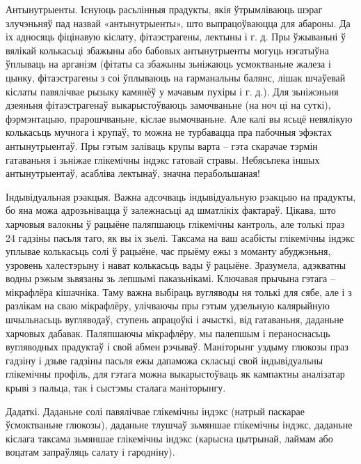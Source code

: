 Антынутрыенты.
Існуюць расьлінныя прадукты, якія ўтрымліваюць шэраг злучэньняў пад назвай «антынутрыенты», што выпрацоўваюцца для абароны. Да іх адносяць фіцінавую кіслату, фітаэстрагены, лектыны і г. д. Пры ўжываньні ў вялікай колькасьці збажыны або бабовых антынутрыенты могуць нэгатыўна ўплываць на арганізм (фітаты са збажыны зьніжаюць усмоктваньне жалеза і цынку, фітаэстрагены з соі ўплываюць на гарманальны балянс, лішак шчаўевай кіслаты павялічвае рызыку камянёў у мачавым пухіры і г. д.). Для зьніжэньня дзеяньня фітаэстрагенаў выкарыстоўваюць замочваньне (на ноч ці на суткі), фэрмэнтацыю, прарошчваньне, кіслае вымочваньне. Але калі вы ясьцё невялікую колькасьць мучнога і крупаў, то можна не турбавацца пра пабочныя эфэктах антынутрыентаў. Пры гэтым заліваць крупы варта – гэта скарачае тэрмін гатаваньня і зьніжае глікемічны індэкс гатовай стравы. Небясьпека іншых антынутрыентаў, асабліва лектынаў, значна перабольшаная!

Індывідуальная рэакцыя.
Важна адсочваць індывідуальную рэакцыю на прадукты, бо яна можа адрозьнівацца ў залежнасьці ад шматлікіх фактараў. Цікава, што харчовыя валокны ў рацыёне паляпшаюць глікемічны кантроль, але толькі праз 24 гадзіны пасьля таго, як вы іх зьелі. Таксама на ваш асабісты глікемічны індэкс уплывае колькасьць солі ў рацыёне, час прыёму ежы з моманту абуджэньня, узровень халестэрыну і нават колькасьць вады ў рацыёне. Зразумела, адэкватны водны рэжым зьвязаны зь лепшымі паказьнікамі. Ключавая прычына гэтага – мікрафлёра кішачніка. Таму важна выбіраць вугляводы ня толькі для сябе, але і з разлікам на сваю мікрафлёру, улічваючы пры гэтым удзельную калярыйную шчыльнасьць вугляводаў, ступень апрацоўкі і ачысткі, від гатаваньня, даданьне харчовых дабавак. Паляпшаючы мікрафлёру, мы палепшым і пераноснасьць вугляводных прадуктаў і свой абмен рэчываў. Маніторынг уздыму глюкозы праз гадзіну і дзьве гадзіны пасьля ежы дапаможа скласьці свой індывідуальны глікемічны профіль, для гэтага можна выкарыстоўваць як кампактны аналізатар крыві з пальца, так і сыстэмы сталага маніторынгу.

Дадаткі.
Даданьне солі павялічвае глікемічны індэкс (натрый паскарае ўсмоктваньне глюкозы), даданьне тлушчаў зьмяншае глікемічны індэкс, даданьне кіслага таксама зьмяншае глікемічны індэкс (карысна цытрынай, лаймам або воцатам запраўляць салату і гародніну).


